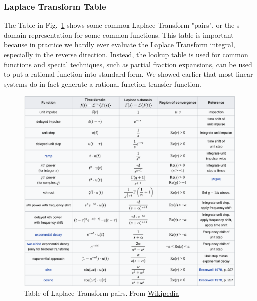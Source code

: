 \subsubsection{Laplace Transform Table}
The Table in Fig.~\ref{fig:laplace_xform} shows some common Laplace Transform "pairs", or the s-domain representation for some common functions.   This table is important because in practice we hardly ever evaluate the Laplace Transform integral, especially in the reverse direction.  Instead, the lookup table is used for common functions and special techniques, such as partial fraction expansions, can be used to put a rational function into standard form.  We showed earlier that most linear systems do in fact generate a rational function transfer function.  
\begin{figure}[tb]
\begin{center}
\includegraphics[width=\columnwidth]{laplace_transform.png}
\end{center}
\caption{Table of Laplace Transform pairs.  From \href{https://en.wikipedia.org/wiki/Laplace_transform}{Wikipedia}}
\label{fig:laplace_xform}
\end{figure}
